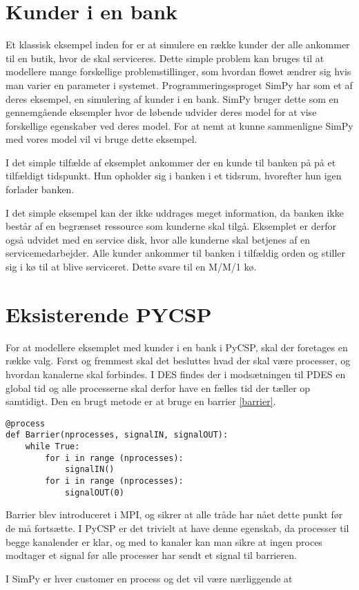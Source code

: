 \section{Kunder i en bank} Et klassisk eksempel inden for \des er at simulere  
en række kunder der alle ankommer til en butik, hvor de skal serviceres. Dette 
simple problem kan bruges til at modellere mange forskellige 
problemstillinger, som hvordan flowet ændrer sig hvis man varier en parameter 
i systemet. Programmeringssproget SimPy har som et af deres eksempel, en 
simulering af kunder i en bank. SimPy bruger dette som en gennemgående 
eksempler hvor de løbende udvider deres model for at vise forskellige 
egenskaber ved deres model. For at nemt at kunne sammenligne SimPy  med vores 
model vil vi bruge dette eksempel.

I det simple tilfælde af eksemplet ankommer der en kunde til banken på på et 
tilfældigt tidspunkt. Hun opholder sig i banken i et tidsrum, hvorefter hun 
igen forlader banken.

I det simple eksempel kan der ikke uddrages meget information, da banken ikke 
består af en begrænset ressource som kunderne skal tilgå.  Eksemplet er derfor 
også udvidet med en service disk, hvor alle kunderne skal betjenes af en 
servicemedarbejder. Alle kunder ankommer til banken i tilfældig orden og 
stiller sig i kø til at blive serviceret. Dette  svare til en M/M/1 kø.


\section{Eksisterende PYCSP}
For at modellere eksemplet med kunder i en bank i PyCSP, skal der foretages en række valg. Først og fremmest skal det besluttes hvad der skal være processer, og hvordan  kanalerne skal forbindes. 
I DES findes der i modsætningen til PDES  en global tid og alle processerne skal derfor have  en fælles tid der tæller op samtidigt. Den en brugt metode er at  bruge en barrier \vref{barrier}.

\begin{lstlisting}[label=barrier,caption=A barrier in PyCSP]
@process
def Barrier(nprocesses, signalIN, signalOUT):
	while True:
		for i in range (nprocesses):
			signalIN()
		for i in range (nprocesses):
			signalOUT(0)
\end{lstlisting}

Barrier blev introduceret i MPI, og sikrer at alle tråde har nået dette punkt før de må fortsætte. 
I PyCSP er det trivielt at have  denne egenskab, da processer til begge kanalender er klar, og med to kanaler kan man sikre at ingen proces modtager et signal før alle processer har sendt et signal til barrieren.

I SimPy er hver customer en process og det vil være nærliggende at 


